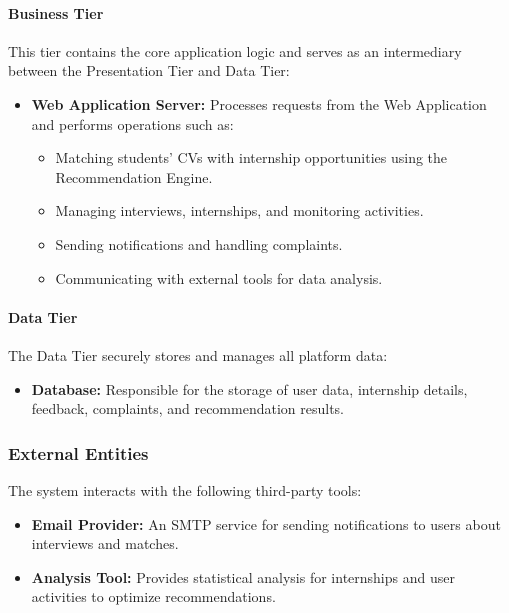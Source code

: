 \paragraph{Business Tier}
This tier contains the core application logic and serves as an intermediary between the Presentation Tier and Data Tier:
\begin{itemize}
    \item \textbf{Web Application Server:} Processes requests from the Web Application and performs operations such as:
    \begin{itemize}
        \item Matching students' CVs with internship opportunities using the Recommendation Engine.
        \item Managing interviews, internships, and monitoring activities.
        \item Sending notifications and handling complaints.
        \item Communicating with external tools for data analysis.
    \end{itemize}
\end{itemize}

\paragraph{Data Tier}
The Data Tier securely stores and manages all platform data:
\begin{itemize}
    \item \textbf{Database:} Responsible for the storage of user data, internship details, feedback, complaints, and recommendation results.
\end{itemize}

\subsubsection{External Entities}
The system interacts with the following third-party tools:
\begin{itemize}
    \item \textbf{Email Provider:} An SMTP service for sending notifications to users about interviews and matches.
    \item \textbf{Analysis Tool:} Provides statistical analysis for internships and user activities to optimize recommendations.
\end{itemize}


